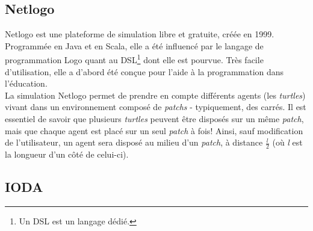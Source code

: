 \subsection{Netlogo}
Netlogo\nocite{NetlogoManuel} est une plateforme de simulation libre et gratuite, créée en 1999. Programmée en Java et en Scala, elle a été influencé par le langage de programmation Logo quant au DSL\footnote{Un DSL est un langage dédié.} dont elle est pourvue. Très facile d'utilisation, elle a d'abord été conçue pour l'aide à la programmation dans l'éducation.
\\
La simulation Netlogo permet de prendre en compte différents agents (les \textit{turtles}) vivant dans un environnement composé de \textit{patchs} - typiquement, des carrés. Il est essentiel de savoir que plusieurs \textit{turtles} peuvent être disposés sur un même \textit{patch}, mais que chaque agent est placé sur un seul \textit{patch} à fois! Ainsi, sauf modification de l'utilisateur, un agent sera disposé au milieu d'un \textit{patch}, à distance $\frac{l}{2}$ (où \textit{l} est la longueur d'un côté de celui-ci).

\subsection{IODA}

